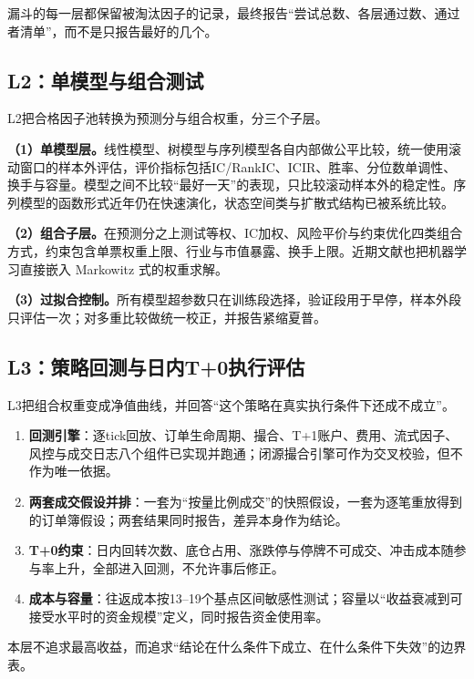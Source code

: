 \documentclass[11pt,a4paper]{article}
\begin{document}
漏斗的每一层都保留被淘汰因子的记录，最终报告``尝试总数、各层通过数、通过者清单''，而不是只报告最好的几个。

\subsection*{L2：单模型与组合测试}

L2把合格因子池转换为预测分与组合权重，分三个子层。

\textbf{（1）单模型层。}线性模型、树模型与序列模型各自内部做公平比较，统一使用滚动窗口的样本外评估，评价指标包括IC/RankIC、ICIR、胜率、分位数单调性、换手与容量。模型之间不比较``最好一天''的表现，只比较滚动样本外的稳定性。序列模型的函数形式近年仍在快速演化，状态空间类与扩散式结构已被系统比较\citep{wang2025mamba,su2025diffusion}。

\textbf{（2）组合子层。}在预测分之上测试等权、IC加权、风险平价与约束优化四类组合方式，约束包含单票权重上限、行业与市值暴露、换手上限。近期文献也把机器学习直接嵌入 Markowitz 式的权重求解\citep{lpez2025enhancing}。

\textbf{（3）过拟合控制。}所有模型超参数只在训练段选择，验证段用于早停，样本外段只评估一次；对多重比较做统一校正，并报告紧缩夏普\citep{bailey2017,lopezdeprado2018}。

\subsection*{L3：策略回测与日内T+0执行评估}

L3把组合权重变成净值曲线，并回答``这个策略在真实执行条件下还成不成立''。

\begin{enumerate}
  \item \textbf{回测引擎}：逐tick回放、订单生命周期、撮合、T+1账户、费用、流式因子、风控与成交日志八个组件已实现并跑通；闭源撮合引擎可作为交叉校验，但不作为唯一依据。
  \item \textbf{两套成交假设并排}：一套为``按量比例成交''的快照假设，一套为逐笔重放得到的订单簿假设；两套结果同时报告，差异本身作为结论。
  \item \textbf{T+0约束}：日内回转次数、底仓占用、涨跌停与停牌不可成交、冲击成本随参与率上升，全部进入回测，不允许事后修正。
  \item \textbf{成本与容量}：往返成本按13--19个基点区间敏感性测试；容量以``收益衰减到可接受水平时的资金规模''定义，同时报告资金使用率。
\end{enumerate}

本层不追求最高收益，而追求``结论在什么条件下成立、在什么条件下失效''的边界表。
\end{document}
